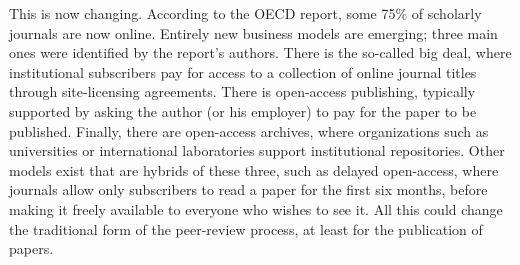 \documentclass[a4paper]{article}
\begin{document}
\par
This is now changing. According to the OECD report, some 75\% of scholarly journals are now online. Entirely new business models are emerging; three main ones were identified by the report’s authors. There is the so-called big deal, where institutional subscribers pay for access to a collection of online journal titles through site-licensing agreements. There is open-access publishing, typically supported by asking the author (or his employer) to pay for the paper to be published. Finally, there are open-access archives, where organizations such as universities or international laboratories support institutional repositories. Other models exist that are hybrids of these three, such as delayed open-access, where journals allow only subscribers to read a paper for the first six months, before making it freely available to everyone who wishes to see it. All this could change the traditional form of the peer-review process, at least for the publication of papers.
\end{document}
